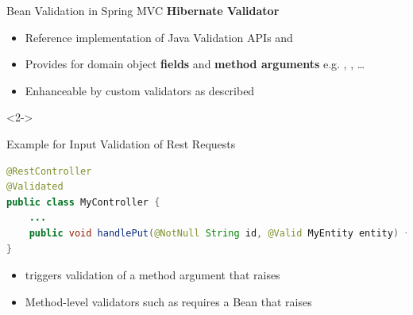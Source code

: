 \begin{frame}[fragile]{Bean Validation in Spring MVC}
\small
\textbf{Hibernate Validator}
\begin{itemize}
\item Reference implementation of Java Validation APIs  and 
\item Provides  for domain object \textbf{fields} and \textbf{method arguments} e.g. , ,  \ldots
\item Enhanceable by custom validators as described 
\end{itemize}
\vfill
\begin{visibleenv}<2->
\begin{block}{Example for Input Validation of Rest Requests}
\begin{lstlisting}[language=Java,belowskip=-3mm,aboveskip=-1mm]
@RestController
@Validated
public class MyController {
	...
	public void handlePut(@NotNull String id, @Valid MyEntity entity) { ... }  
}
\end{lstlisting}
\end{block}
\vfill
\begin{itemize}
    \item \scriptsize{ triggers validation of a  method argument that raises }\\
    \item \scriptsize{Method-level validators such as  requires a  Bean that raises }
\end{itemize}
\end{visibleenv} 
\end{frame}


